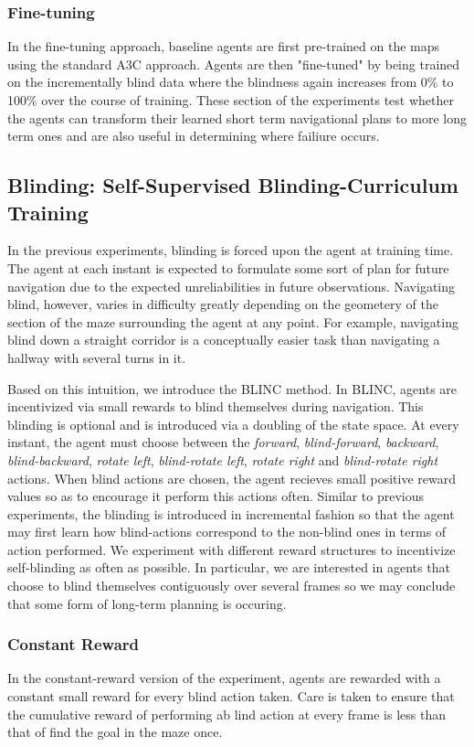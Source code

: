 \subsubsection{Fine-tuning}
In the fine-tuning approach, baseline agents are first pre-trained on the maps using the standard A3C approach. Agents are then "fine-tuned" by being trained on the incrementally blind data where the blindness  again increases from 0\% to 100\% over the course of training. These section of the experiments test whether the agents can transform their learned short term navigational plans to more long term ones and are also useful in determining where failiure occurs.

\subsection{Blinding: Self-Supervised Blinding-Curriculum Training}
In the previous experiments, blinding is forced upon the agent at training time. The agent at each instant is expected to formulate some sort of plan for future navigation due to the expected unreliabilities in future observations. Navigating blind, however, varies in difficulty greatly depending on the geometery of the section of the maze surrounding the agent at any point. For example, navigating blind down a straight corridor is a conceptually easier task than navigating a hallway with several turns in it. 

Based on this intuition, we introduce the BLINC method. In BLINC, agents are incentivized via small rewards to blind themselves during navigation. This blinding is optional and is introduced via a doubling of the state space. At every instant, the agent must choose between the \emph{forward}, \emph{blind-forward}, \emph{backward}, \emph{blind-backward}, \emph{rotate left}, \emph{blind-rotate left}, \emph{rotate right} and \emph{blind-rotate right} actions. When blind actions are chosen, the agent recieves small positive reward values so as to encourage it perform this actions often. Similar to previous experiments, the blinding is introduced in incremental fashion so that the agent may first learn how blind-actions correspond to the non-blind ones in terms of action performed. We experiment with different reward structures to incentivize self-blinding as often as possible. In particular, we are interested in agents that choose to blind themselves contiguously over several frames so we may conclude that some form of long-term planning is occuring. 

\subsubsection{Constant Reward}
In the constant-reward version of the experiment, agents are rewarded with a constant small reward for every blind action taken. Care is taken to ensure that the cumulative reward of performing ab lind action at every frame is less than that of find the goal in the maze once.

